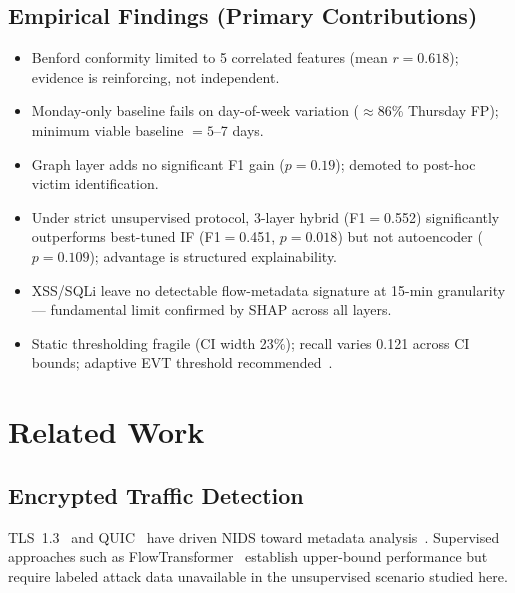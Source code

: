 \documentclass[journal,10pt,twoside]{IEEEtran}
\begin{document}
\subsection*{Empirical Findings (Primary Contributions)}
\begin{itemize}
  \item[\textbf{F1}] Benford conformity limited to 5 correlated
    features (mean $r{=}0.618$); evidence is reinforcing, not
    independent.
  \item[\textbf{F2}] Monday-only baseline fails on day-of-week
    variation (${\approx}86\%$ Thursday FP); minimum viable
    baseline $= 5$--7 days.
  \item[\textbf{F3}] Graph layer adds no significant F1 gain
    ($p{=}0.19$); demoted to post-hoc victim identification.
  \item[\textbf{F4}] Under strict unsupervised protocol, 3-layer
    hybrid (F1$=$0.552) significantly outperforms best-tuned IF
    (F1$=$0.451, $p{=}0.018$) but not autoencoder ($p{=}0.109$);
    advantage is structured explainability.
  \item[\textbf{F5}] XSS/SQLi leave no detectable flow-metadata
    signature at 15-min granularity --- fundamental limit confirmed
    by SHAP across all layers.
  \item[\textbf{F6}] Static thresholding fragile (CI width 23\%);
    recall varies 0.121 across CI bounds; adaptive EVT threshold
    recommended~\cite{siffer2017evt,zhao2023evt}.
\end{itemize}

\section{Related Work}
\label{sec:related}

\subsection{Encrypted Traffic Detection}
TLS~1.3~\cite{rescorla2018tls} and QUIC~\cite{iyengar2021quic}
have driven NIDS toward metadata
analysis~\cite{nguyen2023diet,rahman2023lstma,liu2023multigran,islam2023flowids}.
Supervised approaches such as
FlowTransformer~\cite{xliu2024flowtransformer} establish
upper-bound performance but require labeled attack data unavailable
in the unsupervised scenario studied here.
\end{document}
